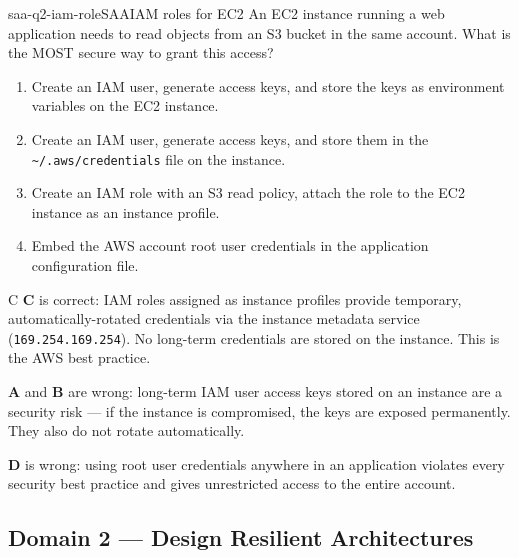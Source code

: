 
\begin{question}{saa-q2-iam-role}{SAA}{IAM roles for EC2}
An EC2 instance running a web application needs to read objects from an S3 bucket in the same account. What is the MOST secure way to grant this access?

\begin{enumerate}[label=\Alph*.]
  \item Create an IAM user, generate access keys, and store the keys as environment variables on the EC2 instance.
  \item Create an IAM user, generate access keys, and store them in the \texttt{\textasciitilde/.aws/credentials} file on the instance.
  \item Create an IAM role with an S3 read policy, attach the role to the EC2 instance as an instance profile.
  \item Embed the AWS account root user credentials in the application configuration file.
\end{enumerate}
\end{question}

\begin{answer}{C}
\textbf{C} is correct: IAM roles assigned as instance profiles provide temporary, automatically-rotated credentials via the instance metadata service (\texttt{169.254.169.254}). No long-term credentials are stored on the instance. This is the AWS best practice.

\textbf{A} and \textbf{B} are wrong: long-term IAM user access keys stored on an instance are a security risk --- if the instance is compromised, the keys are exposed permanently. They also do not rotate automatically.

\textbf{D} is wrong: using root user credentials anywhere in an application violates every security best practice and gives unrestricted access to the entire account.
\end{answer}


\subsection{Domain 2 --- Design Resilient Architectures}

